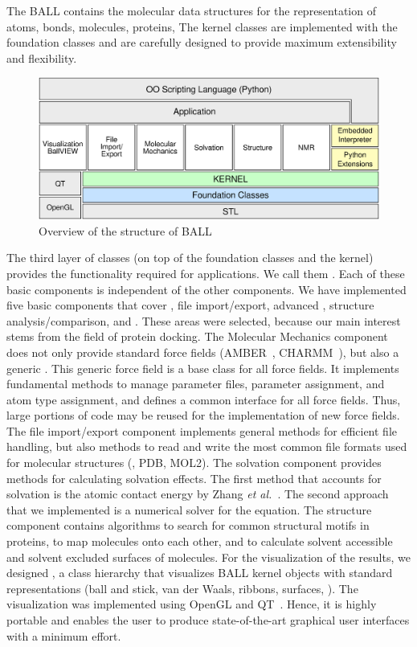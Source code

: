 The BALL  contains the molecular data structures for the
representation of atoms, bonds, molecules, proteins, \etc  The kernel classes
are implemented with the foundation classes and are carefully designed to
provide maximum extensibility and flexibility.
\begin{figure}[tb]
  \centering\includegraphics[width=\textwidth]{BALL_structure.eps}
  \caption{Overview of the structure of BALL}
  \label{fig:BALL_structure}
\end{figure}

The third layer of classes (on top of the foundation classes and the kernel)
provides the functionality required for applications. We call them
. Each of these basic components is independent of
the other components.  We have implemented five basic components that cover
, file import/export, advanced , structure analysis/comparison, and . These
areas were selected, because our main interest stems from the field of protein
docking. The Molecular Mechanics component does not only provide standard
force fields (AMBER~\cite{AMBER95}, CHARMM~\cite{BBO+83}), but also a generic
.  This generic force field is a base class for all force
fields. It implements fundamental methods to manage parameter files, parameter
assignment, and atom type assignment, and defines a common interface for all
force fields. Thus, large portions of code may be reused for the
implementation of new force fields.  The file import/export component
implements general methods for efficient file handling, but also methods to
read and write the most common file formats used for molecular structures
(\eg, PDB, MOL2). The solvation component provides methods for calculating
solvation effects. The first method that accounts for solvation is the atomic
contact energy by Zhang {\it et al.}~\cite{ZVC+97}. The second approach that
we implemented is a numerical solver for the  equation.  The
structure component contains algorithms to search for common structural motifs
in proteins, to map molecules onto each other, and to calculate solvent
accessible and solvent excluded surfaces of molecules. For the visualization
of the results, we designed , a class hierarchy that
visualizes BALL kernel objects with standard representations (ball and stick,
van der Waals, ribbons, surfaces, \etc). The visualization was implemented
using OpenGL and QT~\cite{QT}. Hence, it is highly portable and enables the
user to produce state-of-the-art graphical user interfaces with a minimum
effort.



